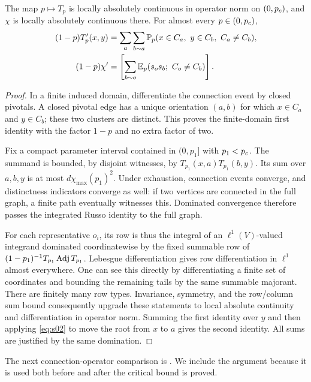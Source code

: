 \begin{lemma}\label{pre:russo}
The map $p\mapsto T_p$ is locally absolutely continuous in operator
norm on $(0,{p_c})$, and $\chi$ is locally absolutely continuous there.
For almost every $p\in(0,{p_c})$,
\begin{equation}\label{eq:s04}
 \begin{aligned}
 (1-p)T'_p(x,y)
 &=\sum_a\sum_{b\sim a}
   \mathbb P_p(x\in C_a,\ y\in C_b,\ C_a\ne C_b),\\
 (1-p)\chi'
 &=\left[\sum_{b\sim o}
   \mathbb E_p(s_o s_b;\ C_o\ne C_b)\right].
 \end{aligned}
\end{equation}
\end{lemma}
\begin{proof}
In a finite induced domain, differentiate the connection event by
closed pivotals. A closed pivotal edge has a unique orientation
$(a,b)$ for which $x\in C_a$ and $y\in C_b$; these two clusters are
distinct. This proves the finite-domain first identity with the
factor $1-p$ and no extra factor of two.

Fix a compact parameter interval contained in $(0,p_1]$ with
$p_1<{p_c}$. The summand is bounded, by disjoint witnesses, by
$T_{p_1}(x,a)T_{p_1}(b,y)$. Its sum over $a,b,y$ is at most
$d\chi_{\max}(p_1)^2$. Under exhaustion, connection events converge,
and distinctness indicators converge as well: if two vertices are
connected in the full graph, a finite path eventually witnesses this.
Dominated convergence therefore passes the integrated Russo identity
to the full graph.

For each representative $o_i$, its row is thus the integral of an
$\ell^1(V)$-valued integrand dominated coordinatewise by the fixed
summable row of $(1-p_1)^{-1}T_{p_1}\operatorname{Adj} T_{p_1}$. Lebesgue
differentiation gives row differentiation in $\ell^1$ almost
everywhere. One can see this directly by differentiating a finite
set of coordinates and bounding the remaining tails by the same
summable majorant. There are finitely many row types. Invariance,
symmetry, and the row/column sum bound consequently upgrade these
statements to local absolute continuity and differentiation in
operator norm. Summing the first identity over $y$ and then applying
\eqref{eq:s02} to move the root from $x$ to $a$ gives the second
identity. All sums are justified by the same domination.
\end{proof}

The next connection-operator comparison is
\cite[Lemma~2.4]{Hutchcroft2019}. We include the argument because it is
used both before and after the critical bound is proved.

